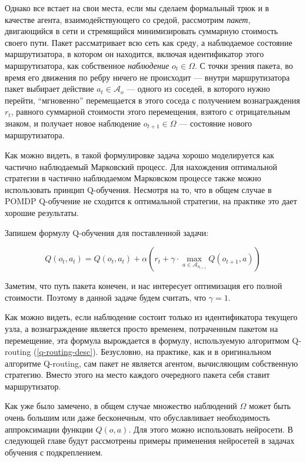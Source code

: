 \documentclass[specification, annotation]{itmo-student-thesis}
\begin{document}
Однако все встает на свои места, если мы сделаем формальный трюк и в качестве
агента, взаимодействующего со средой, рассмотрим \textit{пакет}, двигающийся в
сети и стремящийся минимизировать суммарную стоимость своего пути. Пакет
рассматривает всю сеть как среду, а наблюдаемое состояние маршрутизатора, в
котором он находится, включая идентификатор этого маршрутизатора, как
собственное \textit{наблюдение}  $o_t \in \Omega$. С точки зрения пакета, во время
его движения по ребру ничего не происходит --- внутри маршрутизатора пакет
выбирает действие $a_t \in \mathcal{A}_o$ --- одного из соседей, в которого нужно
перейти, ``мгновенно'' перемещается в этого соседа с получением вознаграждения $r_t$,
равного суммарной стоимости этого перемещения, взятого с отрицательным знаком, и
получает новое наблюдение $o_{t+1} \in \Omega$ --- состояние нового маршрутизатора.

Как можно видеть, в такой формулировке задача хорошо моделируется как частично
наблюдаемый Марковский процесс. Для нахождения оптимальной стратегии в частично
наблюдаемом Марковском процессе также можно использовать принцип Q-обучения.
Несмотря на то, что в общем случае в POMDP Q-обучение не сходится к оптимальной
стратегии, на практике это дает хорошие результаты.

Запишем формулу Q-обучения для поставленной задачи:

\[
Q(o_t, a_t) = Q(o_t, a_t) + \alpha \left( r_t +
\gamma \cdot \max\limits_{a \in \mathcal{A}_{o_{t+1}}} Q(o_{t+1}, a) \right)
\]

Заметим, что путь пакета конечен, и нас интересует оптимизация его полной
стоимости. Поэтому в данной задаче будем считать, что $\gamma = 1$.

Как можно видеть, если наблюдение состоит только из идентификатора текущего
узла, а вознаграждение является просто временем, потраченным пакетом на
перемещение, эта формула вырождается в формулу, используемую алгоритмом
Q-routing (\ref{q-routing-desc}). Безусловно, на практике, как и в оригинальном
алгоритме Q-routing, сам пакет не является агентом, вычисляющим собственную
стратегию. Вместо этого на место каждого очередного пакета себя ставит
маршрутизатор.

Как уже было замечено, в общем случае множество наблюдений $\Omega$ может быть
очень большим или даже бесконечным, что обуславливает необходимость
аппроксимации функции $Q(o, a)$. Для этого можно использовать нейросети. В
следующей главе будут рассмотрены примеры применения нейросетей в задачах
обучения с подкреплением.
\end{document}
